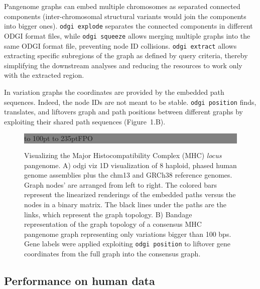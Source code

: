 \documentclass{bioinfo}
\begin{document}
    Pangenome graphs can embed multiple chromosomes as separated connected components (inter-chromosomal structural
    variants would join the components into bigger ones). \texttt{odgi explode} separates the connected components in
    different ODGI format files, while \texttt{odgi squeeze} allows merging multiple graphs into the same ODGI format
    file, preventing node ID collisions. \texttt{odgi extract} allows extracting specific subregions of the graph as
    defined by query criteria, thereby simplifying the downstream analyses and reducing the resources to work only
    with the extracted region.

    In variation graphs the coordinates are provided by the embedded path sequences. Indeed, the node IDs are not
    meant to be stable. \texttt{odgi position} finds, translates, and liftovers graph and path positions between
    different graphs by exploiting their shared path sequences (Figure~1.B\vphantom{\ref{fig:01}}).

    \begin{figure}[!tpb]%
        \fboxsep=0pt\colorbox{gray}{
            \begin{minipage}[t]{235pt}
                \vbox to 100pt{
                    \vfill\hbox to
                    235pt{\hfill\fontsize{24pt}{24pt}\selectfont FPO\hfill}
                    \vfill
                }
            \end{minipage}}
        \caption{
            Visualizing the Major Histocompatibility Complex (MHC) \textit{locus} pangenome. A) odgi viz 1D
            visualization of 8 haploid, phased human genome assemblies plus the chm13 and GRCh38 reference genomes.
            Graph nodes’ are arranged from left to right. The colored bars represent the linearized renderings of the
            embedded paths versus the nodes in a binary matrix. The black lines under the paths are the links, which
            represent the graph topology. B) Bandage~\citep{26099265} representation of the graph topology of a
            consensus MHC pangenome graph representing only variations bigger than 100 bps. Gene labels were applied
            exploiting \texttt{odgi position} to liftover gene coordinates from the full graph into the consensus
            graph.
        }\label{fig:01}
    \end{figure}

    \subsection{Performance on human data}
\end{document}
